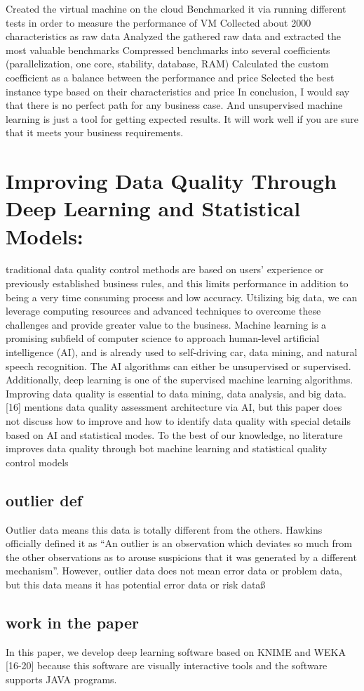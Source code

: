 \documentclass{article}
\begin{document}
Created the virtual machine on the cloud
Benchmarked it via running different tests in order to measure the performance of VM
Collected about 2000 characteristics as raw data
Analyzed the gathered raw data and extracted the most valuable benchmarks
Compressed benchmarks into several coefficients (parallelization, one core, stability, database, RAM)
Calculated the custom coefficient as a balance between the performance and price
Selected the best instance type based on their characteristics and price
In conclusion, I would say that there is no perfect path for any business case. And unsupervised machine learning is just a tool for getting expected results. It will work well if you are sure that it meets your business requirements.
\section{Improving Data Quality Through Deep Learning and Statistical Models:}
traditional data quality control
methods are based on users’ experience or
previously established business rules, and this
limits performance in addition to being a very
time consuming process and low accuracy.
Utilizing big data, we can leverage computing
resources and advanced techniques to overcome
these challenges and provide greater value to the
business.
Machine learning is a promising subfield of
computer science to approach human-level
artificial intelligence (AI), and is already used to
self-driving car, data mining, and natural speech
recognition.
The AI algorithms can either
be unsupervised or supervised. Additionally,
deep learning is one of the supervised machine
learning algorithms.
Improving data quality
is essential to data mining, data analysis, and big
data. [16] mentions data quality assessment
architecture via AI, but this paper does not
discuss how to improve and how to identify data
quality with special details based on AI and
statistical modes.
To the best of our knowledge,
no literature improves data quality through bot
machine learning and statistical quality control
models
\subsection{outlier def}
Outlier data means this data is totally
different from the others. Hawkins officially
defined it as “An outlier is an observation which
deviates so much from the other observations as
to arouse suspicions that it was generated by a
different mechanism”.
However, outlier data
does not mean error data or problem data, but
this data means it has potential error data or risk
dataß
\subsection{work in the paper}
In this paper, we develop deep learning
software based on KNIME and WEKA [16-20]
because this software are visually interactive
tools and the software supports JAVA programs.
\end{document}
